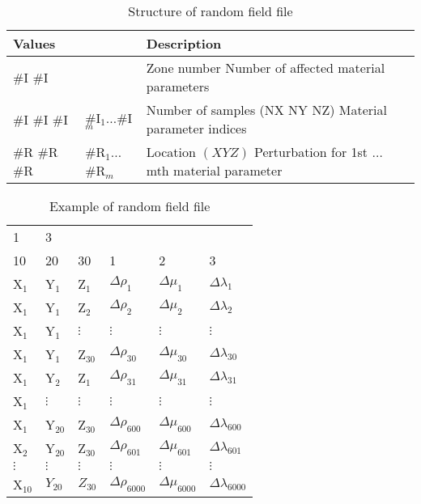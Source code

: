 \documentclass[12pt,twoside]{article}
\begin{document}
\begin{table}
\caption{Structure of random field file}
\begin{center}
\begin{tabular}{lll}
\hline
Values & & Description \\
\hline
\#I \; \#I & & Zone number \; Number of affected material parameters \\
\#I \; \#I \; \#I & \#I$_1 \dots $\#I$_m$ & Number of samples (NX NY NZ) \;
Material parameter indices \\
\#R \; \#R \; \#R & \#R$_1 \dots $\#R$_m$ & Location $(X Y Z)$ \;
Perturbation for 1st $\dots$ mth material parameter \\
\hline
\end{tabular}
\end{center}
\label{randfile-table}
\end{table}

\begin{table}
\caption{Example of random field file}
\begin{center}
\begin{tabular}{llllll}
\hline
1 & 3 & & & & \\
10 & 20 & 30 & 1 & 2 & 3 \\
X$_1$ & Y$_1$ & Z$_1$ & $\Delta\rho_1$ & $\Delta\mu_1$ & $\Delta\lambda_1$ \\
X$_1$ & Y$_1$ & Z$_2$ & $\Delta\rho_2$ & $\Delta\mu_2$ & $\Delta\lambda_2$ \\
X$_1$ & Y$_1$ & $\vdots$ & $\vdots$ & $\vdots$ & $\vdots$ \\
X$_1$ & Y$_1$ & Z$_{30}$ & $\Delta\rho_{30}$ & $\Delta\mu_{30}$ &
$\Delta\lambda_{30}$ \\
X$_1$ & Y$_2$ & Z$_1$ & $\Delta\rho_{31}$ & $\Delta\mu_{31}$ &
$\Delta\lambda_{31}$ \\
X$_1$ & $\vdots$ & $\vdots$ & $\vdots$ & $\vdots$ & $\vdots$ \\
X$_1$ & Y$_{20}$ & Z$_{30}$ & $\Delta\rho_{600}$ & $\Delta\mu_{600}$ &
$\Delta\lambda_{600}$ \\
X$_2$ & Y$_{20}$ & Z$_{30}$ & $\Delta\rho_{601}$ & $\Delta\mu_{601}$ &
$\Delta\lambda_{601}$ \\
$\vdots$ & $\vdots$ & $\vdots$ & $\vdots$ & $\vdots$ & $\vdots$ \\
X$_{10}$ & $Y_{20}$ & $Z_{30}$ & $\Delta\rho_{6000}$ & $\Delta\mu_{6000}$ &
$\Delta\lambda_{6000}$ \\
\hline
\end{tabular}
\end{center}
\label{randfileexample-table}
\end{table}
\end{document}
